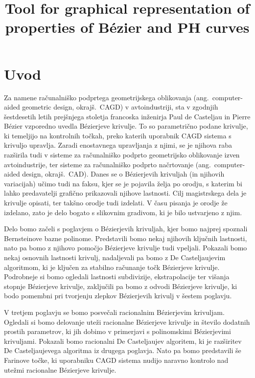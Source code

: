\documentclass[isrm2, tisk]{fmfdelo}
\title{Tool for graphical representation of properties of Bézier and PH curves}
\begin{document}
    \section{Uvod}
    Za namene računalniško podprtega geometrijskega oblikovanja (ang.\ computer-aided geometric design, okrajš.\ CAGD) v avtoindustriji, sta v zgodnjih šestdesetih letih prejšnjega stoletja francoska inženirja Paul de Casteljau in Pierre Bézier vzporedno uvedla Bézierjeve krivulje.
    To so parametrično podane krivulje, ki temeljijo na kontrolnih točkah, preko katerih uporabnik CAGD sistema s krivuljo upravlja.
    Zaradi enostavnega upravljanja z njimi, se je njihova raba razširila tudi v sisteme za računalniško podprto geometrijsko oblikovanje izven avtoindustrije, ter sisteme za računalniško podprto načrtovanje (ang.\ computer-aided design, okrajš.\ CAD).
    Danes se o Bézierjevih krivuljah (in njihovih variacijah) učimo tudi na faksu, kjer se je pojavila želja po orodju, s katerim bi lahko predavatelji grafično prikazovali njihove lastnosti.
    Cilj magistrskega dela je krivulje opisati, ter takšno orodje tudi izdelati.
    V času pisanja je orodje že izdelano, zato je delo bogato s slikovnim gradivom, ki je bilo ustvarjeno z njim.

    Delo bomo začeli s poglavjem o Bézierjevih krivuljah, kjer bomo najprej spoznali Bernsteinove bazne polinome.
    Predstavili bomo nekaj njihovih ključnih lastnosti, nato pa bomo z njihovo pomočjo Bézierjeve krivulje tudi vpeljali.
    Pokazali bomo nekaj osnovnih lastnosti krivulj, nadaljevali pa bomo z De Casteljaujevim algoritmom, ki je ključen za stabilno računanje točk Bézierjeve krivulje.
    Podrobneje si bomo ogledali lastnosti subdivizije, ekstrapolacije ter višanja stopnje Bézierjeve krivulje, zaključili pa bomo z odvodi Bézierjeve krivulje, ki bodo pomembni pri tvorjenju zlepkov Bézierjevih krivulj v šestem poglavju.

    V tretjem poglavju se bomo posvečali racionalnim Bézierjevim krivuljam.
    Ogledali si bomo delovanje uteži racionalne Bézierjeve krivulje in število dodatnih prostih parametrov, ki jih dobimo v primerjavi s polinomskimi Bézierjevimi krivuljami.
    Pokazali bomo racionalni De Casteljaujev algoritem, ki je razširitev De Casteljaujevega algoritma iz drugega poglavja.
    Nato pa bomo predstavili še Farinove točke, ki uporabniku CAGD sistema nudijo naravno kontrolo nad utežmi racionalne Bézierjeve krivulje.
\end{document}
